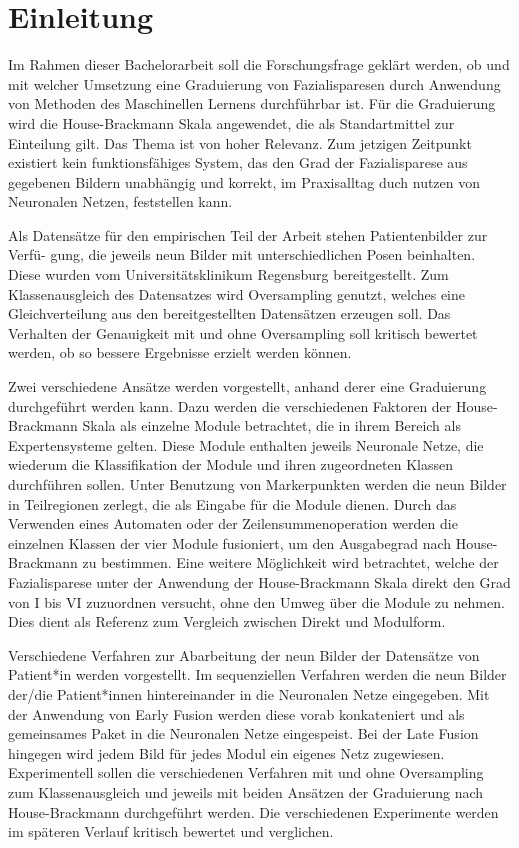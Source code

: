 
\chapter{Einleitung}
\label{einleitung}

Im Rahmen dieser Bachelorarbeit soll die Forschungsfrage geklärt werden, ob und mit welcher Umsetzung eine Graduierung von Fazialisparesen durch Anwendung von Methoden des Maschinellen Lernens durchführbar ist. Für die Graduierung wird die House-Brackmann Skala angewendet, die als Standartmittel zur Einteilung gilt. Das Thema ist von hoher Relevanz. Zum jetzigen Zeitpunkt existiert kein funktionsfähiges System, das den Grad der Fazialisparese aus gegebenen Bildern unabhängig und korrekt, im Praxisalltag duch nutzen von Neuronalen Netzen, feststellen kann.

Als Datensätze für den empirischen Teil der Arbeit stehen Patientenbilder zur Verfü- gung, die jeweils neun Bilder mit unterschiedlichen Posen beinhalten. Diese wurden vom Universitätsklinikum Regensburg bereitgestellt. Zum Klassenausgleich des Datensatzes wird Oversampling genutzt, welches eine Gleichverteilung aus den bereitgestellten Datensätzen erzeugen soll. Das Verhalten der Genauigkeit mit und ohne Oversampling soll kritisch bewertet werden, ob so bessere Ergebnisse erzielt werden können.

Zwei verschiedene Ansätze werden vorgestellt, anhand derer eine Graduierung durchgeführt werden kann. Dazu werden die verschiedenen Faktoren der House-Brackmann Skala als einzelne Module betrachtet, die in ihrem Bereich als Expertensysteme gelten. Diese Module enthalten jeweils Neuronale Netze, die wiederum die Klassifikation der Module und ihren zugeordneten Klassen durchführen sollen. Unter Benutzung von Markerpunkten werden die neun Bilder in Teilregionen zerlegt, die als Eingabe für die Module dienen. Durch das Verwenden eines Automaten oder der Zeilensummenoperation werden die einzelnen Klassen der vier Module fusioniert, um den Ausgabegrad nach House-Brackmann zu bestimmen. Eine weitere Möglichkeit wird betrachtet, welche der Fazialisparese unter der Anwendung der House-Brackmann Skala direkt den Grad von I bis VI zuzuordnen versucht, ohne den Umweg über die Module zu nehmen. Dies dient als Referenz zum Vergleich zwischen Direkt und Modulform.

Verschiedene Verfahren zur Abarbeitung der neun Bilder der Datensätze von Patient*in werden vorgestellt. Im sequenziellen Verfahren werden die neun Bilder der/die Patient*innen hintereinander in die Neuronalen Netze eingegeben. Mit der Anwendung von Early Fusion werden diese vorab konkateniert und als gemeinsames Paket in die Neuronalen Netze eingespeist. Bei der Late Fusion hingegen wird jedem Bild für jedes Modul ein eigenes Netz zugewiesen. Experimentell sollen die verschiedenen Verfahren mit und ohne Oversampling zum Klassenausgleich und jeweils mit beiden Ansätzen der Graduierung nach House-Brackmann durchgeführt werden. Die verschiedenen Experimente werden im späteren Verlauf kritisch bewertet und verglichen.

